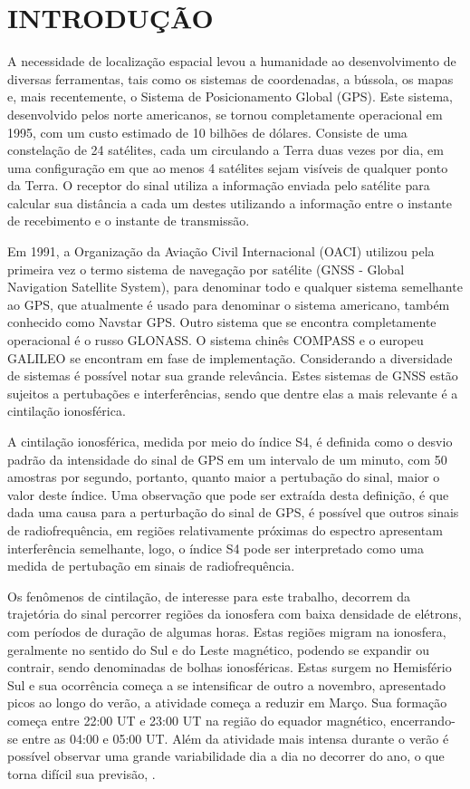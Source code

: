 \chapter{INTRODUÇÃO}

A necessidade de localização espacial levou a humanidade ao desenvolvimento de diversas ferramentas, tais como os sistemas de coordenadas, a bússola, os mapas e, mais recentemente, o Sistema de Posicionamento Global (GPS). Este sistema, desenvolvido pelos norte americanos, se tornou completamente operacional em 1995, com um custo estimado de 10 bilhões de dólares. Consiste de uma constelação de 24 satélites, cada um circulando a Terra duas vezes por dia, em uma configuração em que ao menos 4 satélites sejam visíveis de qualquer ponto da Terra. O receptor do sinal utiliza a informação enviada pelo satélite para calcular sua distância a cada um destes utilizando a informação entre o instante de recebimento e o instante de transmissão. 

Em 1991, a Organização da Aviação Civil Internacional (OACI) utilizou pela primeira vez o termo sistema de navegação por satélite (GNSS - Global Navigation Satellite System), para denominar todo e qualquer sistema semelhante ao GPS, que atualmente é usado para denominar o sistema americano, também conhecido como Navstar GPS. Outro sistema que se encontra completamente operacional é o russo GLONASS. O sistema chinês COMPASS e o europeu GALILEO se encontram em fase de implementação. Considerando a diversidade de sistemas é possível notar sua grande relevância. Estes sistemas de GNSS estão sujeitos a pertubações e interferências, sendo que dentre elas a mais relevante é a cintilação ionosférica.

A cintilação ionosférica, medida por meio do índice S4, é definida como o desvio padrão da intensidade do sinal de GPS em um intervalo de um minuto, com 50 amostras por segundo, portanto, quanto maior a pertubação do sinal, maior o valor deste índice. Uma observação que pode ser extraída desta definição, é que dada uma causa para a perturbação do sinal de GPS, é possível que outros sinais de radiofrequência, em regiões relativamente próximas do espectro apresentam interferência semelhante, logo, o índice S4 pode ser interpretado como uma medida de pertubação em sinais de radiofrequência.

Os fenômenos de cintilação, de interesse para este trabalho, decorrem da trajetória do sinal percorrer regiões da ionosfera com baixa densidade de elétrons, com períodos de duração de algumas horas. Estas regiões migram na ionosfera, geralmente no sentido do Sul e do Leste magnético, podendo se expandir ou contrair, sendo denominadas de bolhas ionosféricas. Estas surgem no Hemisfério Sul e sua ocorrência começa a se intensificar de outro a novembro, apresentado picos ao longo do verão, a atividade começa a reduzir em Março. Sua formação começa entre 22:00 UT e 23:00 UT na região do equador magnético, encerrando-se entre as 04:00 e 05:00 UT. Além da atividade mais intensa durante o verão é possível observar uma grande variabilidade dia a dia no decorrer do ano, o que torna difícil sua previsão, \cite{TAKAHASHI:2006}.

